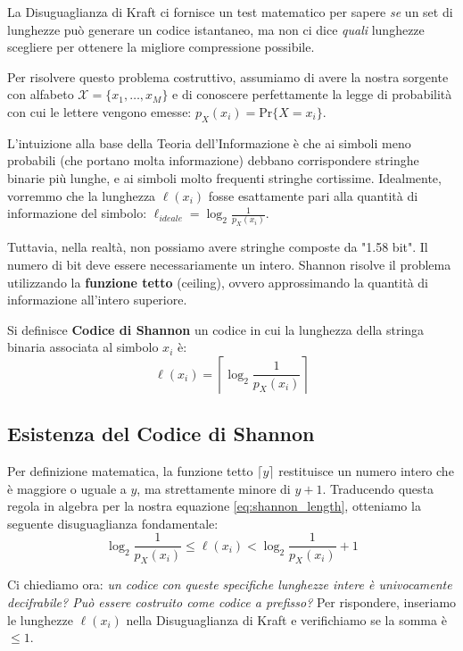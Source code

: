 La Disuguaglianza di Kraft ci fornisce un test matematico per sapere \textit{se} un set di lunghezze può generare un codice istantaneo, ma non ci dice \textit{quali} lunghezze scegliere per ottenere la migliore compressione possibile.

Per risolvere questo problema costruttivo, assumiamo di avere la nostra sorgente con alfabeto $\mathcal{X} = \{x_1, \dots, x_M\}$ e di conoscere perfettamente la legge di probabilità con cui le lettere vengono emesse: $p_X(x_i) = \text{Pr}\{X = x_i\}$.

L'intuizione alla base della Teoria dell'Informazione è che ai simboli meno probabili (che portano molta informazione) debbano corrispondere stringhe binarie più lunghe, e ai simboli molto frequenti stringhe cortissime. Idealmente, vorremmo che la lunghezza $\ell(x_i)$ fosse esattamente pari alla quantità di informazione del simbolo: $\ell_{ideale} = \log_2 \frac{1}{p_X(x_i)}$. 

Tuttavia, nella realtà, non possiamo avere stringhe composte da "1.58 bit". Il numero di bit deve essere necessariamente un intero. Shannon risolve il problema utilizzando la \textbf{funzione tetto} (ceiling), ovvero approssimando la quantità di informazione all'intero superiore.

Si definisce \textbf{Codice di Shannon} un codice in cui la lunghezza della stringa binaria associata al simbolo $x_i$ è:
\begin{equation}
\label{eq:shannon_length}
\ell(x_i) = \left\lceil \log_2 \frac{1}{p_X(x_i)} \right\rceil
\end{equation}

\subsection{Esistenza del Codice di Shannon}

Per definizione matematica, la funzione tetto $\lceil y \rceil$ restituisce un numero intero che è maggiore o uguale a $y$, ma strettamente minore di $y+1$. Traducendo questa regola in algebra per la nostra equazione \ref{eq:shannon_length}, otteniamo la seguente disuguaglianza fondamentale:
\begin{equation} \label{eq:bounds_shannon}
\log_2 \frac{1}{p_X(x_i)} \le \ell(x_i) < \log_2 \frac{1}{p_X(x_i)} + 1
\end{equation}

Ci chiediamo ora: \textit{un codice con queste specifiche lunghezze intere è univocamente decifrabile? Può essere costruito come codice a prefisso?}
Per rispondere, inseriamo le lunghezze $\ell(x_i)$ nella Disuguaglianza di Kraft e verifichiamo se la somma è $\le 1$.

